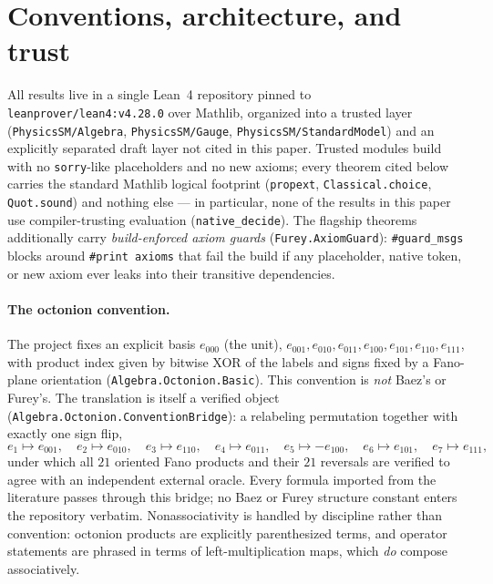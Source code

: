 \documentclass[11pt]{article}
\newcommand{\leanname}[1]{\texttt{#1}}
\begin{document}
\section{Conventions, architecture, and trust}
\label{sec:conventions}

All results live in a single Lean~4 repository pinned to
\leanname{leanprover/lean4:v4.28.0} over Mathlib, organized into a trusted
layer (\leanname{PhysicsSM/Algebra}, \leanname{PhysicsSM/Gauge},
\leanname{PhysicsSM/StandardModel}) and an explicitly separated draft
layer not cited in this paper.  Trusted modules build with no
\leanname{sorry}-like placeholders and no new axioms; every theorem cited
below carries the standard Mathlib logical footprint
(\leanname{propext}, \leanname{Classical.choice}, \leanname{Quot.sound})
and nothing else --- in particular, none of the results in this paper use
compiler-trusting evaluation (\leanname{native\_decide}).  The flagship
theorems additionally carry \emph{build-enforced axiom guards}
(\leanname{Furey.AxiomGuard}): \leanname{\#guard\_msgs} blocks around
\leanname{\#print axioms} that fail the build if any placeholder, native
token, or new axiom ever leaks into their transitive dependencies.

\paragraph{The octonion convention.}  The project fixes an explicit basis
$e_{000}$ (the unit), $e_{001}, e_{010}, e_{011}, e_{100}, e_{101},
e_{110}, e_{111}$, with product index given by bitwise XOR of the labels
and signs fixed by a Fano-plane orientation
(\leanname{Algebra.Octonion.Basic}).  This convention is \emph{not}
Baez's or Furey's.  The translation is itself a verified object
(\leanname{Algebra.Octonion.ConventionBridge}): a relabeling permutation
together with exactly one sign flip,
\[
e_1 \mapsto e_{001},\quad e_2 \mapsto e_{010},\quad e_3 \mapsto e_{110},
\quad e_4 \mapsto e_{011},\quad
\boxed{e_5 \mapsto -e_{100}},\quad e_6 \mapsto e_{101},\quad
e_7 \mapsto e_{111},
\]
under which all $21$ oriented Fano products and their $21$ reversals are
verified to agree with an independent external oracle.  Every formula
imported from the literature passes through this bridge; no Baez or Furey
structure constant enters the repository verbatim.  Nonassociativity is
handled by discipline rather than convention: octonion products are
explicitly parenthesized terms, and operator statements are phrased in
terms of left-multiplication maps, which \emph{do} compose associatively.
\end{document}
